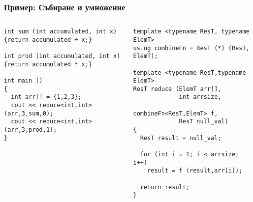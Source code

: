 \documentclass{beamer}
\begin{document}
\begin{frame}[fragile]
\frametitle{Пример: Събиране и умножение}


\begin{columns}[t]
  \begin{column}{0.55\textwidth}

\begin{flushleft}
\begin{lstlisting}
int sum (int accumulated, int x)
{return accumulated + x;}

int prod (int accumulated, int x)
{return accumulated * x;}

int main ()
{
  int arr[] = {1,2,3};
  cout << reduce<int,int> (arr,3,sum,0);
  cout << reduce<int,int> (arr,3,prod,1);
}

\end{lstlisting}  
\end{flushleft}
  \end{column}
  \begin{column}{0.45\textwidth}
\begin{flushleft}
\vspace{-30px}
\begin{lstlisting}
template <typename ResT, typename ElemT>
using combineFn = ResT (*) (ResT, ElemT);

template <typename ResT,typename ElemT>
ResT reduce (ElemT arr[], 
             int arrsize, 
             combineFn<ResT,ElemT> f, 
             ResT null_val)
{
  ResT result = null_val;

  for (int i = 1; i < arrsize; i++)
    result = f (result,arr[i]);

  return result;
}
\end{lstlisting}  
\end{flushleft}

  \end{column}
\end{columns}


\end{frame}
\end{document}
